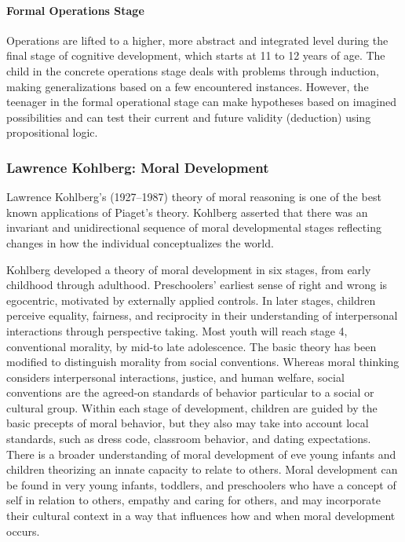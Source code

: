 \paragraph{Formal Operations Stage}
Operations are lifted to a higher, more abstract and integrated level during
the final stage of cognitive development, which starts at 11 to 12 years of
age. The child in the concrete operations stage deals with problems through
induction, making generalizations based on a few encountered instances.
However, the teenager in the formal operational stage can make hypotheses based
on imagined possibilities and can test their current and future validity
(deduction) using propositional logic. \cite{Feldman3}

\subsubsection{Lawrence Kohlberg: Moral Development}
Lawrence Kohlberg’s (1927–1987) theory of moral reasoning is one of the best
known applications of Piaget’s theory. Kohlberg asserted that there was an
invariant and unidirectional sequence of moral developmental stages reflecting
changes in how the individual conceptualizes the world. \cite{Feldman3}

Kohlberg developed a theory of moral development in six stages, from early
childhood through adulthood. Preschoolers’ earliest sense of right and wrong is
egocentric, motivated by externally applied controls. In later stages, children
perceive equality, fairness, and reciprocity in their understanding of
interpersonal interactions through perspective taking. Most youth will reach
stage 4, conventional morality, by mid-to late adolescence. The basic theory
has been modified to distinguish morality from social conventions. Whereas
moral thinking considers interpersonal interactions, justice, and human
welfare, social conventions are the agreed-on standards of behavior particular
to a social or cultural group. Within each stage of development, children are
guided by the basic precepts of moral behavior, but they also may take into
account local standards, such as dress code, classroom behavior, and dating
expectations. There is a broader understanding of moral development of eve
young infants and children theorizing an innate capacity to relate to others.
Moral development can be found in very young infants, toddlers, and
preschoolers who have a concept of self in relation to others, empathy and
caring for others, and may incorporate their cultural context in a way that
influences how and when moral development occurs. \cite{Nelson19}

